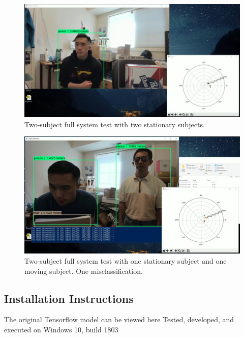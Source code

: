 \documentclass[onecolumn, draftclsnofoot,10pt, compsoc]{IEEEtran}
\makeatletter
\newcommand\captionof[1]{\def\@captype{#1}\caption}
\makeatother
\begin{document}
\begin{singlespace}
		\begin{figure}[H]
		\includegraphics[scale=0.4]{final2.PNG}
		\captionof{figure}{Two-subject full system test with two stationary subjects.}
		\label{final2}
		\end{figure}

		\begin{figure}[H]
		\includegraphics[scale=0.4]{final1.PNG}
		\captionof{figure}{Two-subject full system test with one stationary subject and one moving subject. One misclassification.}
		\label{final1}
		\end{figure}

	\subsection{Installation Instructions}
		The original Tensorflow model can be viewed here 
		Tested, developed, and executed on Windows 10, build 1803


\end{singlespace}
\end{document}

